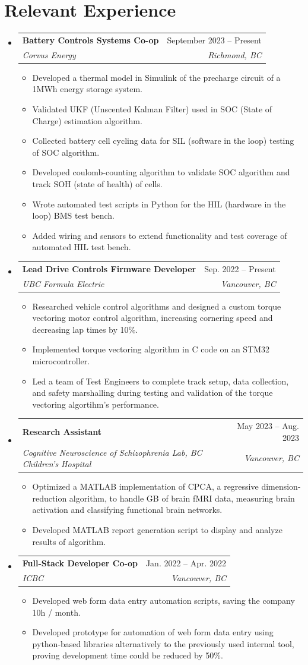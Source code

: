 \documentclass[letterpaper,11pt]{article}
\makeatletter
\newcommand{\resumeItem}[1]{
  \item\small{
    {#1 \vspace{-2pt}}
  }
}
\newcommand{\resumeSubheading}[4]{
  \vspace{-2pt}\item
    \begin{tabular*}{0.97\textwidth}[t]{l@{\extracolsep{\fill}}r}
      \textbf{#1} & #2 \\
      \textit{\small#3} & \textit{\small #4} \\
    \end{tabular*}\vspace{-7pt}
}
\newcommand{\resumeSubHeadingListStart}{\begin{itemize}[leftmargin=0.15in, label={}]}
\newcommand{\resumeSubHeadingListEnd}{\end{itemize}}
\newcommand{\resumeItemListStart}{\begin{itemize}}
\newcommand{\resumeItemListEnd}{\end{itemize}\vspace{-5pt}}
\makeatother
\begin{document}
\section{Relevant Experience}
  \resumeSubHeadingListStart
    \resumeSubheading
      {Battery Controls Systems Co-op}{September 2023 -- Present}
      {Corvus Energy}{Richmond, BC}
      \resumeItemListStart
        \resumeItem{Developed a thermal model in Simulink of the precharge circuit of a 1MWh energy storage system.}
        \resumeItem{Validated UKF (Unscented Kalman Filter) used in SOC (State of Charge) estimation algorithm.}
        \resumeItem{Collected battery cell cycling data for SIL (software in the loop) testing of SOC algorithm.} 
        \resumeItem{Developed coulomb-counting algorithm to validate SOC algorithm and track SOH (state of health) of cells.}
        \resumeItem{Wrote automated test scripts in Python for the HIL (hardware in the loop) BMS test bench.}
        \resumeItem{Added wiring and sensors to extend functionality and test coverage of automated HIL test bench.}
      \resumeItemListEnd
  \resumeSubheading
      {Lead Drive Controls Firmware Developer}{Sep. 2022 -- Present}
      {UBC Formula Electric}{Vancouver, BC}
      \resumeItemListStart
        \resumeItem{Researched vehicle control algorithms and designed a custom torque vectoring motor control algorithm, increasing cornering speed and decreasing lap times by 10\%.}
        \resumeItem{Implemented torque vectoring algorithm in C code on an STM32 microcontroller.}
        \resumeItem{Led a team of Test Engineers to complete track setup, data collection, and safety marshalling during testing and validation of the torque vectoring algortihm's performance.}
      \resumeItemListEnd
    \resumeSubheading
      {Research Assistant}{May 2023 -- Aug. 2023}
      {Cognitive Neuroscience of Schizophrenia Lab, BC Children's Hospital}{Vancouver, BC}
      \resumeItemListStart
        \resumeItem{Optimized a MATLAB implementation of CPCA, a regressive dimension-reduction algorithm, to handle GB of brain fMRI data, measuring brain activation and classifying functional brain networks.}
        \resumeItem{Developed MATLAB report generation script to display and analyze results of algorithm. }
      \resumeItemListEnd
  \resumeSubheading
      {Full-Stack Developer Co-op}{Jan. 2022 -- Apr. 2022}
      {ICBC}{Vancouver, BC}
      \resumeItemListStart
        \resumeItem{Developed web form data entry automation scripts, saving the company 10h / month.}
        \resumeItem{Developed prototype for automation of web form data entry using python-based libraries alternatively to the previously used internal tool, 
        proving development time could be reduced by 50\%.}
      \resumeItemListEnd
  \resumeSubHeadingListEnd
\end{document}
